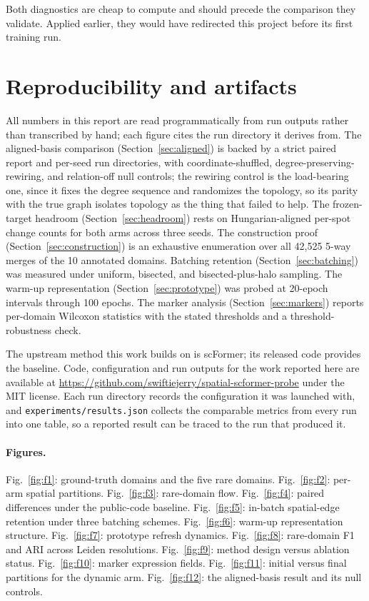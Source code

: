 \documentclass[twocolumn,10pt]{article}
\begin{document}
Both diagnostics are cheap to compute and should precede the comparison they validate. Applied earlier, they would have redirected this project before its first training run.

\section{Reproducibility and artifacts}
\label{sec:repro}

All numbers in this report are read programmatically from run outputs rather than transcribed by hand; each figure cites the run directory it derives from. The aligned-basis comparison (Section~\ref{sec:aligned}) is backed by a strict paired report and per-seed run directories, with coordinate-shuffled, degree-preserving-rewiring, and relation-off null controls; the rewiring control is the load-bearing one, since it fixes the degree sequence and randomizes the topology, so its parity with the true graph isolates topology as the thing that failed to help. The frozen-target headroom (Section~\ref{sec:headroom}) rests on Hungarian-aligned per-spot change counts for both arms across three seeds. The construction proof (Section~\ref{sec:construction}) is an exhaustive enumeration over all 42{,}525 5-way merges of the 10 annotated domains. Batching retention (Section~\ref{sec:batching}) was measured under uniform, bisected, and bisected-plus-halo sampling. The warm-up representation (Section~\ref{sec:prototype}) was probed at 20-epoch intervals through 100 epochs. The marker analysis (Section~\ref{sec:markers}) reports per-domain Wilcoxon statistics with the stated thresholds and a threshold-robustness check.

The upstream method this work builds on is scFormer; its released code provides the baseline. Code, configuration and run outputs for the work reported here are available at \url{https://github.com/swiftiejerry/spatial-scformer-probe} under the MIT license. Each run directory records the configuration it was launched with, and \texttt{experiments/results.json} collects the comparable metrics from every run into one table, so a reported result can be traced to the run that produced it.

\paragraph{Figures.} Fig.~\ref{fig:f1}: ground-truth domains and the five rare domains. Fig.~\ref{fig:f2}: per-arm spatial partitions. Fig.~\ref{fig:f3}: rare-domain flow. Fig.~\ref{fig:f4}: paired differences under the public-code baseline. Fig.~\ref{fig:f5}: in-batch spatial-edge retention under three batching schemes. Fig.~\ref{fig:f6}: warm-up representation structure. Fig.~\ref{fig:f7}: prototype refresh dynamics. Fig.~\ref{fig:f8}: rare-domain F1 and ARI across Leiden resolutions. Fig.~\ref{fig:f9}: method design versus ablation status. Fig.~\ref{fig:f10}: marker expression fields. Fig.~\ref{fig:f11}: initial versus final partitions for the dynamic arm. Fig.~\ref{fig:f12}: the aligned-basis result and its null controls.
\end{document}

